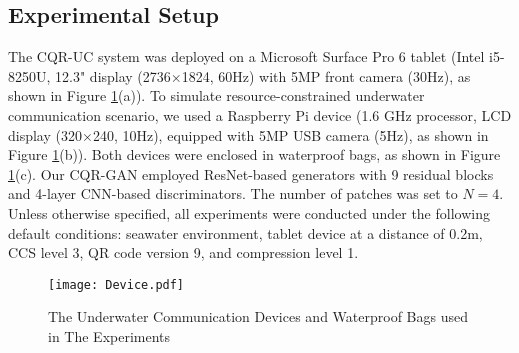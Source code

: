 \documentclass[preprint,12pt]{elsarticle}
\begin{document}
\subsection{Experimental Setup}

The CQR-UC system was deployed on a Microsoft Surface Pro 6 tablet (Intel i5-8250U, 12.3" display (2736$\times$1824, 60Hz) with 5MP front camera (30Hz), as shown in Figure \ref{fig:enter-label}(a)). To simulate resource-constrained underwater communication scenario, we used a Raspberry Pi device (1.6 GHz processor, LCD display (320$\times$240, 10Hz), equipped with 5MP USB camera (5Hz), as shown in Figure \ref{fig:enter-label}(b)). Both devices were enclosed in waterproof bags, as shown in Figure \ref{fig:enter-label}(c). Our CQR-GAN employed ResNet-based generators with 9 residual blocks and 4-layer CNN-based discriminators. The number of patches was set to $N=4$. Unless otherwise specified, all experiments were conducted under the following default conditions: seawater environment, tablet device at a distance of 0.2m, CCS level 3, QR code version 9, and compression level 1.


\begin{figure}[H]
\centering
\texttt{[image: Device.pdf]}
    \caption{The Underwater Communication Devices and Waterproof Bags used in The Experiments}
    \label{fig:enter-label}
\end{figure}

\end{document}
